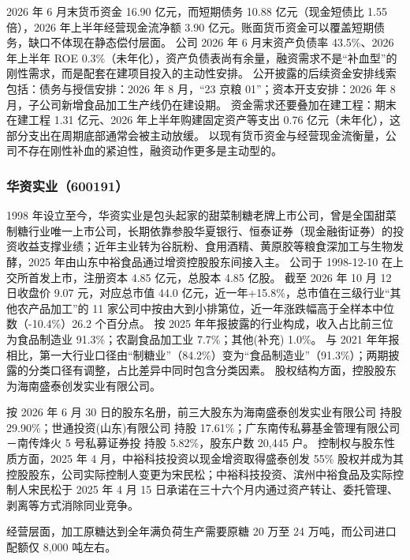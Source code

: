  2026 年 6 月末货币资金 16.90 亿元，而短期债务 10.88 亿元（现金短债比 1.55 倍），2026 年上半年经营现金流净额 3.90 亿元。账面货币资金可以覆盖短期债务，缺口不体现在静态偿付层面。 公司 2026 年 6 月末资产负债率 43.5\%、2026 年上半年 ROE 0.3\%（未年化），资产负债表尚有余量，融资需求不是“补血型”的刚性需求，而是配套在建项目投入的主动性安排。 公开披露的后续资金安排线索包括：债务与授信安排：2026 年 8 月，“23 京粮 01”；资本开支安排：2026 年 8 月，子公司新增食品加工生产线仍在建设期。 资金需求还要叠加在建工程：期末在建工程 1.31 亿元、2026 年上半年购建固定资产等支出 0.76 亿元（未年化），这部分支出在周期底部通常会被主动放缓。 以现有货币资金与经营现金流衡量，公司不存在刚性补血的紧迫性，融资动作更多是主动型的。




\subsubsection{华资实业（600191）}
\label{co:600191}

 1998 年设立至今，华资实业是包头起家的甜菜制糖老牌上市公司，曾是全国甜菜制糖行业唯一上市公司，长期依靠参股华夏银行、恒泰证券（现金融街证券）的投资收益支撑业绩；近年主业转为谷朊粉、食用酒精、黄原胶等粮食深加工与生物发酵，2025 年由山东中裕食品通过增资控股股东间接入主。 公司于 1998-12-10 在上交所首发上市，注册资本 4.85 亿元，总股本 4.85 亿股。 截至 2026 年 10 月 12 日收盘价 9.07 元，对应总市值 44.0 亿元，近一年+15.8\%，总市值在三级行业“其他农产品加工”的 11 家公司中按由大到小排第位，近一年涨跌幅高于全样本中位数（-10.4\%）26.2 个百分点。 按 2025 年年报披露的行业构成，收入占比前三位为食品制造业 91.3\%；农副食品加工业 7.7\%；其他(补充) 1.0\%。 与 2021 年年报相比，第一大行业口径由“制糖业”（84.2\%）变为“食品制造业”（91.3\%）；两期披露的分类口径有调整，占比差异中同时包含分类因素。 股权结构方面，控股股东为海南盛泰创发实业有限公司。

 按 2026 年 6 月 30 日的股东名册，前三大股东为海南盛泰创发实业有限公司 持股 29.90\%；世通投资(山东)有限公司 持股 17.61\%；广东南传私募基金管理有限公司－南传烽火 5 号私募证券投 持股 5.82\%，股东户数 20,445 户。 控制权与股东性质方面，2025 年 4 月，中裕科技投资以现金增资取得盛泰创发 55\% 股权并成为其控股股东，公司实际控制人变更为宋民松；中裕科技投资、滨州中裕食品及实际控制人宋民松于 2025 年 4 月 15 日承诺在三十六个月内通过资产转让、委托管理、剥离等方式消除同业竞争。

 经营层面，加工原糖达到全年满负荷生产需要原糖 20 万至 24 万吨，而公司进口配额仅 8,000 吨左右。

